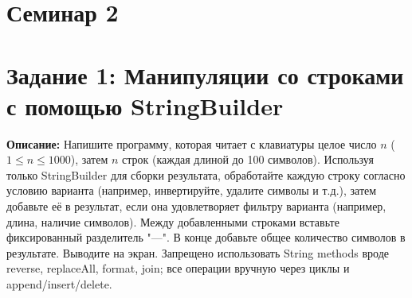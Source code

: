 \documentclass[12pt]{article}
\begin{document}
\section{Семинар 2}

\section*{Задание 1: Манипуляции со строками с помощью StringBuilder}
  \textbf{Описание:} Напишите программу, которая читает с клавиатуры целое число $n$ ($1 \leq n \leq 1000$), затем $n$ строк (каждая длиной до 100 символов). Используя только StringBuilder для сборки результата, обработайте каждую строку согласно условию варианта (например, инвертируйте, удалите символы и т.д.), затем добавьте её в результат, если она удовлетворяет фильтру варианта (например, длина, наличие символов). Между добавленными строками вставьте фиксированный разделитель "---". В конце добавьте общее количество символов в результате. Выводите на экран. Запрещено использовать String methods вроде reverse, replaceAll, format, join; все операции вручную через циклы и append/insert/delete.
\end{document}
